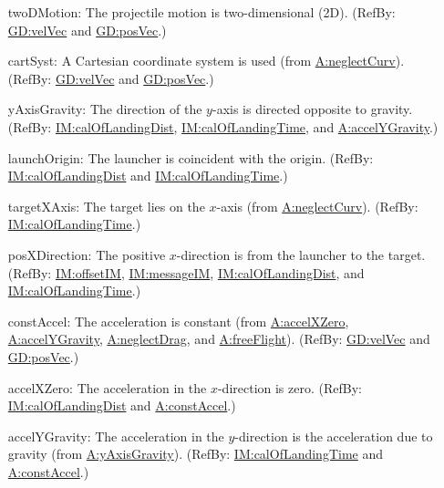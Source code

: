\documentclass[12pt]{article}
\begin{document}
\begin{itemize}
\item[twoDMotion:\phantomsection\label{twoDMotion}]{The projectile motion is two-dimensional (2D). (RefBy: \hyperref[GD:velVec]{GD:velVec} and \hyperref[GD:posVec]{GD:posVec}.)}
\item[cartSyst:\phantomsection\label{cartSyst}]{A Cartesian coordinate system is used (from \hyperref[neglectCurv]{A:neglectCurv}). (RefBy: \hyperref[GD:velVec]{GD:velVec} and \hyperref[GD:posVec]{GD:posVec}.)}
\item[yAxisGravity:\phantomsection\label{yAxisGravity}]{The direction of the $y$-axis is directed opposite to gravity. (RefBy: \hyperref[IM:calOfLandingDist]{IM:calOfLandingDist}, \hyperref[IM:calOfLandingTime]{IM:calOfLandingTime}, and \hyperref[accelYGravity]{A:accelYGravity}.)}
\item[launchOrigin:\phantomsection\label{launchOrigin}]{The launcher is coincident with the origin. (RefBy: \hyperref[IM:calOfLandingDist]{IM:calOfLandingDist} and \hyperref[IM:calOfLandingTime]{IM:calOfLandingTime}.)}
\item[targetXAxis:\phantomsection\label{targetXAxis}]{The target lies on the $x$-axis (from \hyperref[neglectCurv]{A:neglectCurv}). (RefBy: \hyperref[IM:calOfLandingTime]{IM:calOfLandingTime}.)}
\item[posXDirection:\phantomsection\label{posXDirection}]{The positive $x$-direction is from the launcher to the target. (RefBy: \hyperref[IM:offsetIM]{IM:offsetIM}, \hyperref[IM:messageIM]{IM:messageIM}, \hyperref[IM:calOfLandingDist]{IM:calOfLandingDist}, and \hyperref[IM:calOfLandingTime]{IM:calOfLandingTime}.)}
\item[constAccel:\phantomsection\label{constAccel}]{The acceleration is constant (from \hyperref[accelXZero]{A:accelXZero}, \hyperref[accelYGravity]{A:accelYGravity}, \hyperref[neglectDrag]{A:neglectDrag}, and \hyperref[freeFlight]{A:freeFlight}). (RefBy: \hyperref[GD:velVec]{GD:velVec} and \hyperref[GD:posVec]{GD:posVec}.)}
\item[accelXZero:\phantomsection\label{accelXZero}]{The acceleration in the $x$-direction is zero. (RefBy: \hyperref[IM:calOfLandingDist]{IM:calOfLandingDist} and \hyperref[constAccel]{A:constAccel}.)}
\item[accelYGravity:\phantomsection\label{accelYGravity}]{The acceleration in the $y$-direction is the acceleration due to gravity (from \hyperref[yAxisGravity]{A:yAxisGravity}). (RefBy: \hyperref[IM:calOfLandingTime]{IM:calOfLandingTime} and \hyperref[constAccel]{A:constAccel}.)}

\end{itemize}
\end{document}
